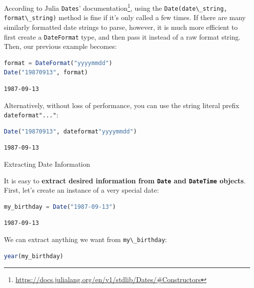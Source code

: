 \documentclass[
  notoc %
]{tufte-book}
\makeatletter
\DeclareRobustCommand{\href}[2]{#2\footnote{\url{#1}}}
\newcommand{\passthrough}[1]{#1}
\renewcommand\subsubsection{%
\@startsection{subsubsection}{3}{\z@ }{-3.25ex\@plus -1ex \@minus -.2ex}{1.5ex \@plus .2ex}{\normalfont \normalsize \bfseries }
}
\makeatother
\begin{document}
According to
\href{https://docs.julialang.org/en/v1/stdlib/Dates/\#Constructors}{Julia
\passthrough{\lstinline!Dates!}' documentation}, using the
\passthrough{\lstinline!Date(date\_string, format\_string)!} method is
fine if it's only called a few times. If there are many similarly
formatted date strings to parse, however, it is much more efficient to
first create a \passthrough{\lstinline!DateFormat!} type, and then pass
it instead of a raw format string. Then, our previous example becomes:

\begin{lstlisting}[language=Julia]
format = DateFormat("yyyymmdd")
Date("19870913", format)
\end{lstlisting}

\begin{lstlisting}[language=Output]
1987-09-13
\end{lstlisting}

Alternatively, without loss of performance, you can use the string
literal prefix \passthrough{\lstinline!dateformat"..."!}:

\begin{lstlisting}[language=Julia]
Date("19870913", dateformat"yyyymmdd")
\end{lstlisting}

\begin{lstlisting}[language=Output]
1987-09-13
\end{lstlisting}

\hypertarget{sec:dates_information}{%
\subsubsection{Extracting Date
Information}\label{sec:dates_information}}

It is easy to \textbf{extract desired information from
\passthrough{\lstinline!Date!} and \passthrough{\lstinline!DateTime!}
objects}. First, let's create an instance of a very special date:

\begin{lstlisting}[language=Julia]
my_birthday = Date("1987-09-13")
\end{lstlisting}

\begin{lstlisting}[language=Output]
1987-09-13
\end{lstlisting}

We can extract anything we want from
\passthrough{\lstinline!my\_birthday!}:

\begin{lstlisting}[language=Julia]
year(my_birthday)
\end{lstlisting}
\end{document}
